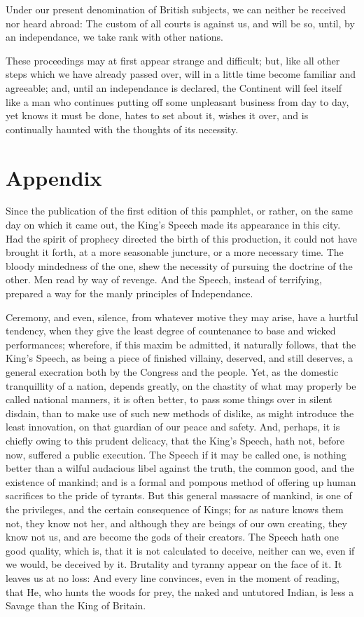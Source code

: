 \documentclass[12pt,oneside]{memoir}
\begin{document}
Under our present denomination of British subjects, we can neither
be received nor heard abroad: The custom of all courts is against us,
and will be so, until, by an independance, we take rank with other
nations.

These proceedings may at first appear strange and difficult; but,
like all other steps which we have already passed over, will in a
little time become familiar and agreeable; and, until an
independance is declared, the Continent will feel itself like a man
who continues putting off some unpleasant business from day to day,
yet knows it must be done, hates to set about it, wishes it over,
and is continually haunted with the thoughts of its necessity.


\backmatter
\section*{Appendix}

Since the publication of the first edition of this pamphlet, or
rather, on the same day on which it came out, the King's Speech made
its appearance in this city. Had the spirit of prophecy directed the
birth of this production, it could not have brought it forth, at a
more seasonable juncture, or a more necessary time. The bloody
mindedness of the one, shew the necessity of pursuing the doctrine
of the other. Men read by way of revenge. And the Speech, instead of
terrifying, prepared a way for the manly principles of Independance.

Ceremony, and even, silence, from whatever motive they may arise,
have a hurtful tendency, when they give the least degree of
countenance to base and wicked performances; wherefore, if this
maxim be admitted, it naturally follows, that the King's Speech, as
being a piece of finished villainy, deserved, and still deserves, a
general execration both by the Congress and the people. Yet, as the
domestic tranquillity of a nation, depends greatly, on the chastity
of what may properly be called national manners, it is often better,
to pass some things over in silent disdain, than to make use of such
new methods of dislike, as might introduce the least innovation, on
that guardian of our peace and safety. And, perhaps, it is chiefly
owing to this prudent delicacy, that the King's Speech, hath not,
before now, suffered a public execution. The Speech if it may be
called one, is nothing better than a wilful audacious libel against
the truth, the common good, and the existence of mankind; and is a
formal and pompous method of offering up human sacrifices to the
pride of tyrants. But this general massacre of mankind, is one of
the privileges, and the certain consequence of Kings; for as nature
knows them not, they know not her, and although they are beings of
our own creating, they know not us, and are become the gods of their
creators. The Speech hath one good quality, which is, that it is not
calculated to deceive, neither can we, even if we would, be deceived
by it. Brutality and tyranny appear on the face of it. It leaves us
at no loss: And every line convinces, even in the moment of reading,
that He, who hunts the woods for prey, the naked and untutored
Indian, is less a Savage than the King of Britain.
\end{document}
